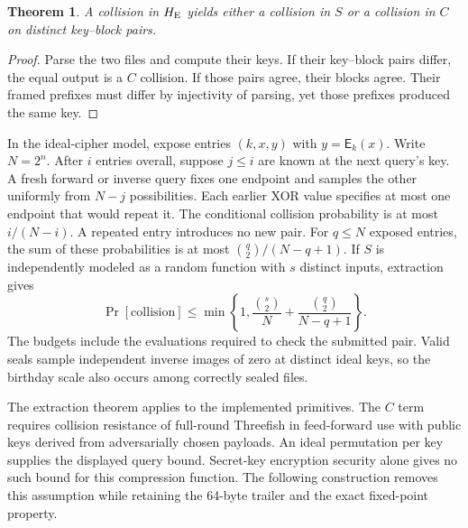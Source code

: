 \documentclass[10pt,twocolumn,letterpaper]{article}
\newtheorem{theorem}{Theorem}
\newcommand{\E}{\mathsf E}
\begin{document}
\begin{theorem}
A collision in \(H_{\rm E}\) yields either a collision in \(S\) or a collision in \(C\) on distinct key--block pairs.
\end{theorem}
\begin{proof}
Parse the two files and compute their keys. If their key--block pairs differ, the equal output is a \(C\) collision. If those pairs agree, their blocks agree. Their framed prefixes must differ by injectivity of parsing, yet those prefixes produced the same key.
\end{proof}

In the ideal-cipher model, expose entries \((k,x,y)\) with \(y=\E_k(x)\). Write \(N=2^n\). After \(i\) entries overall, suppose \(j\le i\) are known at the next query's key. A fresh forward or inverse query fixes one endpoint and samples the other uniformly from \(N-j\) possibilities. Each earlier XOR value specifies at most one endpoint that would repeat it. The conditional collision probability is at most \(i/(N-i)\). A repeated entry introduces no new pair. For \(q\le N\) exposed entries, the sum of these probabilities is at most \(\binom q2/(N-q+1)\). If \(S\) is independently modeled as a random function with \(s\) distinct inputs, extraction gives
\[
 \Pr[\mathrm{collision}]\le
 \min\!\left\{1,\frac{\binom{s}{2}}{N}
                +\frac{\binom q2}{N-q+1}\right\}.
\]
The budgets include the evaluations required to check the submitted pair. Valid seals sample independent inverse images of zero at distinct ideal keys, so the birthday scale also occurs among correctly sealed files.

The extraction theorem applies to the implemented primitives. The \(C\) term requires collision resistance of full-round Threefish in feed-forward use with public keys derived from adversarially chosen payloads. An ideal permutation per key supplies the displayed query bound. Secret-key encryption security alone gives no such bound for this compression function. The following construction removes this assumption while retaining the 64-byte trailer and the exact fixed-point property.
\end{document}
